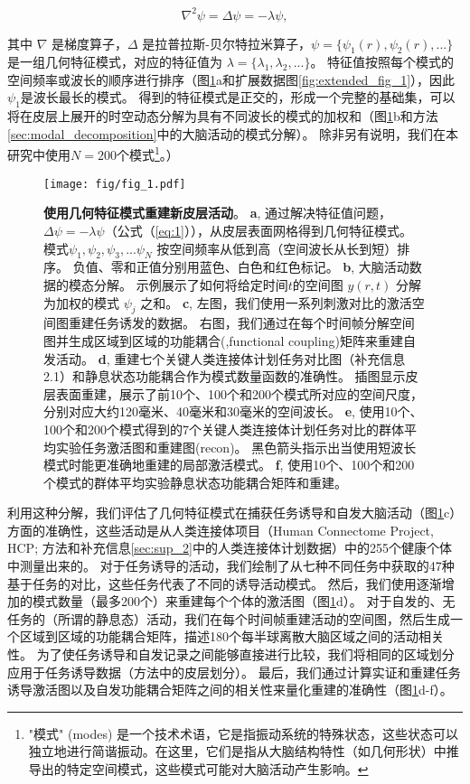 \documentclass[lang=cn,a4paper,newtx]{elegantpaper}
\begin{document}
\begin{equation} \label{eq:1}
	\nabla^2 \psi = \Delta\psi = -\lambda \psi,
\end{equation}


其中 $ \nabla $ 是梯度算子，$ \Delta $ 是拉普拉斯-贝尔特拉米算子，$ \psi = \{\psi_1(r), \psi_2(r),...\} $ 是一组几何特征模式，对应的特征值为 $ \lambda = \{ \lambda_1, \lambda_2, ... \} $。
特征值按照每个模式的空间频率或波长的顺序进行排序（图\ref{fig:1}a和扩展数据图\ref{fig:extended_fig_1}），因此$ \psi_1 $是波长最长的模式。
得到的特征模式是正交的，形成一个完整的基础集，可以将在皮层上展开的时空动态分解为具有不同波长的模式的加权和（图\ref{fig:1}b和方法\ref{sec:modal_decomposition}中的大脑活动的模式分解）。
除非另有说明，我们在本研究中使用$ N = 200 $个模式\footnote{"模式" (modes) 是一个技术术语，它是指振动系统的特殊状态，这些状态可以独立地进行简谐振动。在这里，它们是指从大脑结构特性（如几何形状）中推导出的特定空间模式，这些模式可能对大脑活动产生影响。}。）


\begin{figure}[!htb]
	\centering
	\texttt{[image: fig/fig\_1.pdf]}
	\caption{\textbf{使用几何特征模式重建新皮层活动}。
	\textbf{a}, 通过解决特征值问题，$ \Delta \psi = -\lambda \psi $（公式（\ref{eq:1}）），从皮层表面网格得到几何特征模式。
	模式$ \psi_1, \psi_2, \psi_3, ... \psi_N $ 按空间频率从低到高（空间波长从长到短）排序。
	负值、零和正值分别用蓝色、白色和红色标记。
	\textbf{b}, 大脑活动数据的模态分解。
	示例展示了如何将给定时间$ t $的空间图 $ y(r,t) $ 分解为加权的模式 $ \psi_j $ 之和。
	\textbf{c}, 左图，我们使用一系列刺激对比的激活空间图重建任务诱发的数据。
	右图，我们通过在每个时间帧分解空间图并生成区域到区域的功能耦合(,functional coupling)矩阵来重建自发活动。
	\textbf{d}, 重建七个关键人类连接体计划任务对比图（补充信息2.1）和静息状态功能耦合作为模式数量函数的准确性。
	插图显示皮层表面重建，展示了前10个、100个和200个模式所对应的空间尺度，分别对应大约120毫米、40毫米和30毫米的空间波长。
	 \textbf{e}, 使用10个、100个和200个模式得到的7个关键人类连接体计划任务对比的群体平均实验任务激活图和重建图(recon)。
	 黑色箭头指示出当使用短波长模式时能更准确地重建的局部激活模式。 
	 \textbf{f}, 使用10个、100个和200个模式的群体平均实验静息状态功能耦合矩阵和重建。
	} \label{fig:1}
\end{figure}


利用这种分解，我们评估了几何特征模式在捕获任务诱导和自发大脑活动（图\ref{fig:1}c）方面的准确性，这些活动是从人类连接体项目（Human Connectome Project, HCP; 方法和补充信息\ref{sec:sup_2}中的人类连接体计划数据）中的255个健康个体中测量出来的。
对于任务诱导的活动，我们绘制了从七种不同任务中获取的47种基于任务的对比，这些任务代表了不同的诱导活动模式。
然后，我们使用逐渐增加的模式数量（最多200个）来重建每个个体的激活图（图\ref{fig:1}d）。
对于自发的、无任务的（所谓的静息态）活动，我们在每个时间帧重建活动的空间图，然后生成一个区域到区域的功能耦合矩阵，描述180个每半球离散大脑区域之间的活动相关性。
为了使任务诱导和自发记录之间能够直接进行比较，我们将相同的区域划分应用于任务诱导数据（方法中的皮层划分）。
最后，我们通过计算实证和重建任务诱导激活图以及自发功能耦合矩阵之间的相关性来量化重建的准确性（图\ref{fig:1}d-f）。
\end{document}
